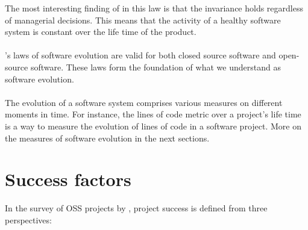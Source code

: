 The most interesting finding of \citeauthor{lehman} in this law is that the
invariance holds regardless of managerial decisions. This means that the
activity of a healthy software system is constant over the life time of the
product.

\paragraph{}
\citeauthor{lehman}'s laws of software evolution are valid for both closed
source software and open-source software. These laws form the foundation of
what we understand as software evolution.

\paragraph{}
The evolution of a software system comprises various measures on different
moments in time. For instance, the lines of code metric over a project's life
time is a way to measure the evolution of lines of code in a software project.
More on the measures of software evolution in the next sections.





\section{Success factors}
In the survey of OSS projects by \citet{androutsellis}, project success is
defined from three perspectives:

